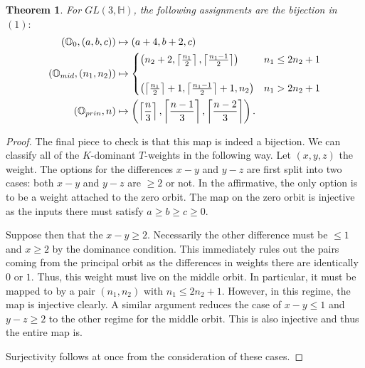 \documentclass[letterpaper,twosided,11pt]{article}
\theoremstyle{plain}
\newtheorem{theorem}{Theorem}[section]
\theoremstyle{definition}
\theoremstyle{remark}
\newcommand{\HH}{\mathbb{H}}
\newcommand{\OO}{\mathbb{O}}
\begin{document}
\begin{theorem}
    For $ GL(3,\HH) $, the following assignments are the bijection in $
    (1): $
    \begin{align*}
        (\OO_0,(a,b,c))&\mapsto (a+4,b+2,c) \\
        (\OO_{mid}, (n_1,n_2))& \mapsto {%
        \begin{cases}
            \left(n_2+2,\left \lceil \frac{n_1}{2} \right\rceil, \left
            \lceil \frac{n_1-1}{2} \right\rceil\right) & n_1\leq 2n_2+1
            \\
            \; \\
            \left(\left \lceil \frac{n_1}{2} \right\rceil+1, \left
            \lceil \frac{n_1-1}{2} \right\rceil+1, n_2\right) & n_1>2n_2+1
        \end{cases}
        } \\
        (\OO_{prin},n)&\mapsto \left( \left \lceil \frac{n}{3} \right\rceil,
        \left \lceil \frac{n-1}{3} \right\rceil, \left \lceil \frac{n-2}
        {3} \right\rceil \right).
    \end{align*}
\end{theorem}

\begin{proof}
    The final piece to check is that this map is indeed a bijection.  We
    can classify all of the $ K $-dominant $ T $-weights in the
    following way.  Let $ (x,y,z) $ the weight.  The options for the
    differences $ x-y $ and $ y-z $ are first split into two cases:
    both $ x-y $ and $ y-z $ are $ \geq 2 $ or not.  In the affirmative,
    the only option is to be a weight attached to the zero orbit.  The
    map on the zero orbit is injective as the inputs there must satisfy $
    a\geq b\geq c\geq 0. $

    Suppose then that the $ x-y\geq 2. $ Necessarily the other
    difference must be $ \leq 1 $ and $ x\geq 2 $ by the dominance
    condition.  This immediately rules out the pairs coming from the
    principal orbit as the differences in weights there are identically $
    0 $ or $ 1. $ Thus, this weight must live on the middle orbit.  In
    particular, it must be mapped to by a pair $ (n_1,n_2) $ with $ n_1\leq
    2n_2+1. $ However, in this regime, the map is injective clearly.  A
    similar argument reduces the case of $ x-y\leq 1 $ and $ y-z\geq 2 $
    to the other regime for the middle orbit.  This is also injective
    and thus the entire map is.

    Surjectivity follows at once from the consideration of these cases.

\end{proof}
\end{document}
